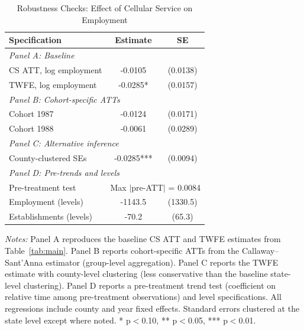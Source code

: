 \begin{table}[H]
\centering
\caption{Robustness Checks: Effect of Cellular Service on Employment}
\begin{threeparttable}
\begin{tabular}{lcc}
\toprule
Specification & Estimate & SE \\
\midrule
\multicolumn{3}{l}{\textit{Panel A: Baseline}} \\[3pt]
CS ATT, log employment & -0.0105 & (0.0138) \\
TWFE, log employment & -0.0285* & (0.0157) \\[6pt]
\multicolumn{3}{l}{\textit{Panel B: Cohort-specific ATTs}} \\[3pt]
Cohort 1987 & -0.0124 & (0.0171) \\
Cohort 1988 & -0.0061 & (0.0289) \\
\multicolumn{3}{l}{\textit{Panel C: Alternative inference}} \\[3pt]
County-clustered SEs & -0.0285*** & (0.0094) \\[6pt]
\multicolumn{3}{l}{\textit{Panel D: Pre-trends and levels}} \\[3pt]
Pre-treatment test & \multicolumn{2}{c}{Max $|$pre-ATT$|$ = 0.0084} \\
Employment (levels) & -1143.5 & (1330.5) \\
Establishments (levels) & -70.2 & (65.3) \\
\bottomrule
\end{tabular}
\begin{tablenotes}[flushleft]
\small
\item \textit{Notes:} Panel A reproduces the baseline CS ATT and TWFE estimates from Table~\ref{tab:main}. Panel B reports cohort-specific ATTs from the Callaway--Sant'Anna estimator (group-level aggregation). Panel C reports the TWFE estimate with county-level clustering (less conservative than the baseline state-level clustering). Panel D reports a pre-treatment trend test (coefficient on relative time among pre-treatment observations) and level specifications. All regressions include county and year fixed effects. Standard errors clustered at the state level except where noted. * p$<$0.10, ** p$<$0.05, *** p$<$0.01.
\end{tablenotes}
\end{threeparttable}
\label{tab:robust}
\end{table}
